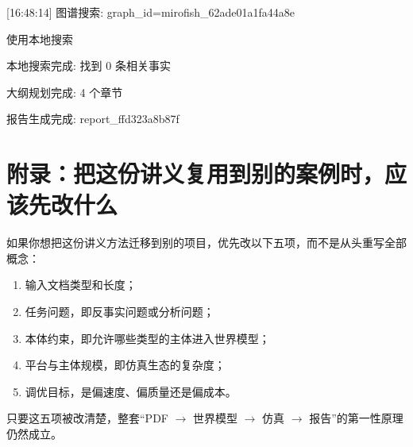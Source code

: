 \documentclass[UTF8,10pt,oneside]{ctexbook}
\begin{document}
\begin{tcolorbox}[colback=SoftGray,colframe=black!30,title=报告日志摘录]
\small\ttfamily\raggedright
[16:48:14] 图谱搜索: graph\_id=mirofish\_62ade01a1fa44a8e\par
[16:48:14] 使用本地搜索\par
[16:48:14] 本地搜索完成: 找到 0 条相关事实\par
[16:48:22] 大纲规划完成: 4 个章节\par
[16:53:16] 报告生成完成: report\_ffd323a8b87f
\end{tcolorbox}

\chapter{附录：把这份讲义复用到别的案例时，应该先改什么}

如果你想把这份讲义方法迁移到别的项目，优先改以下五项，而不是从头重写全部概念：

\begin{enumerate}
  \item 输入文档类型和长度；
  \item 任务问题，即反事实问题或分析问题；
  \item 本体约束，即允许哪些类型的主体进入世界模型；
  \item 平台与主体规模，即仿真生态的复杂度；
  \item 调优目标，是偏速度、偏质量还是偏成本。
\end{enumerate}

只要这五项被改清楚，整套“PDF $\rightarrow$ 世界模型 $\rightarrow$ 仿真 $\rightarrow$ 报告”的第一性原理仍然成立。
\end{document}

